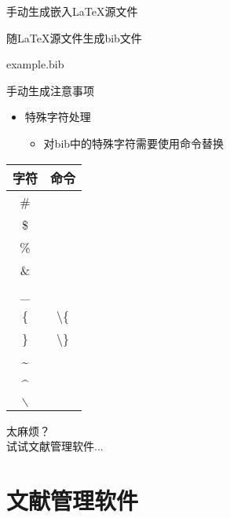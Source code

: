 \documentclass[fontset = none, t]{ctexbeamer}
\begin{document}
\begin{frame}[fragile]{手动生成}{嵌入\LaTeX 源文件}
\begin{spacing}{1.3}
\begin{center}
\begin{minipage}[h]{0.55\linewidth}
\begin{textcb}{随\LaTeX 源文件生成bib文件}
\begin{filecontents}{example.bib}
\begin{frame}[fragile]{手动生成}{注意事项}
  \begin{spacing}{1.3}
    \begin{itemize}
    \item 特殊字符处理
      \begin{itemize}
      \item 对bib中的特殊字符需要使用命令替换
      \end{itemize}
    \end{itemize}
    \begin{center}
      \scriptsize
      \begin{tabular}[h]{|c|c|}        
        \hline
        字符 & 命令 \\ \hline
        \# & \texinline[fontsize=\scriptsize]{\#} \\ \hline
        \$ & \texinline[fontsize=\scriptsize]{\$} \\ \hline
        \% & \texinline[fontsize=\scriptsize]{\%} \\ \hline
        \& & \texinline[fontsize=\scriptsize]{\&} \\ \hline
        \_ & \texinline[fontsize=\scriptsize]{\_} \\ \hline
        \{ & \textbackslash\{ \\ \hline
        \} & \textbackslash\} \\ \hline
        \~{} & \texinline[fontsize=\scriptsize]{\~{}} \\ \hline
        \^{} & \texinline[fontsize=\scriptsize]{\^{}} \\ \hline
        $\backslash$ & \texinline[fontsize=\scriptsize]{$\backslash$} \\ \hline   
      \end{tabular}
    \end{center}
  \end{spacing}  
\end{frame}

\begin{frame}
  太麻烦？\\
  试试文献管理软件...
\end{frame}
\section[文献管理软件]{文献管理软件}

\end{filecontents}
\end{textcb}
\end{minipage}
\end{center}
\end{spacing}
\end{frame}
\end{document}
